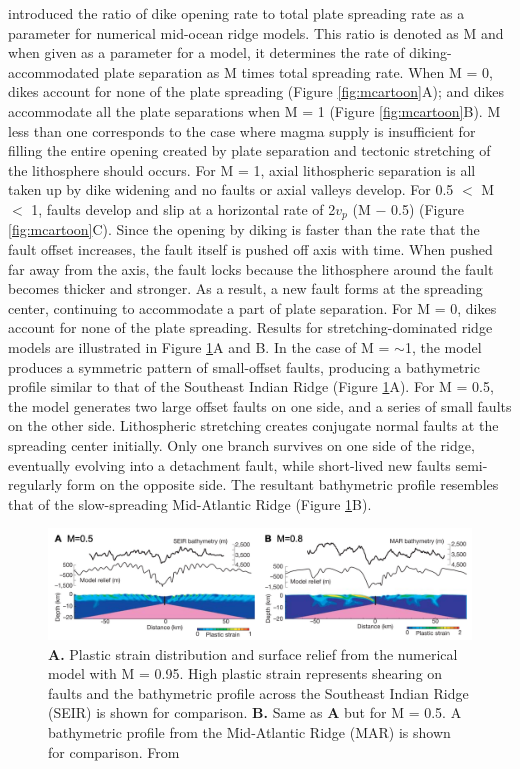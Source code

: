 \documentclass[letterpaper,12pt,notitle]{memphisthesis}                     %
\begin{document}
\citet{Buck2005} introduced the ratio of dike opening rate to total plate spreading rate as a parameter for numerical mid-ocean ridge models. This ratio is denoted as M and when given as a parameter for a model, it determines the rate of diking-accommodated plate separation as M times total spreading rate. When M = 0, dikes account for none of the plate spreading (Figure \ref{fig:mcartoon}A); and dikes accommodate all the plate separations when M = 1 (Figure \ref{fig:mcartoon}B). M less than one corresponds to the case where magma supply is insufficient for filling the entire opening created by plate separation and tectonic stretching of the lithosphere should occurs. For M = 1, axial lithospheric separation is all taken up by dike widening and no faults or axial valleys develop.  For 0.5 $<$ M $<$ 1, faults develop and slip at a horizontal rate of 2$v_p$ (M $-$ 0.5) (Figure \ref{fig:mcartoon}C). Since the opening by diking is faster than the rate that the fault offset increases, the fault itself is pushed off axis with time. When pushed far away from the axis, the fault locks because the lithosphere around the fault becomes thicker and stronger. As a result, a new fault forms at the spreading center, continuing to accommodate a part of plate separation. For M = 0, dikes account for none of the plate spreading. Results for stretching-dominated ridge models are illustrated in Figure \ref{fig:mfactor}A and B. In the case of M = $\sim$1, the model produces a symmetric pattern of small-offset faults, producing a bathymetric profile similar to that of the Southeast Indian Ridge (Figure \ref{fig:mfactor}A). For M = 0.5, the model generates two large offset faults on one side, and a series of small faults on the other side. Lithospheric stretching creates conjugate normal faults at the spreading center initially. Only one branch survives on one side of the ridge, eventually evolving into a detachment fault, while short-lived new faults semi-regularly form on the opposite side. The resultant bathymetric profile resembles that of the slow-spreading Mid-Atlantic Ridge (Figure \ref{fig:mfactor}B).
%
\begin{figure}[!htb]
	\centering
	\includegraphics[width=0.99\linewidth]{./figs/fig1.png}
	\caption{\textbf{A.} Plastic strain distribution and surface relief from the numerical model with M = 0.95. High plastic strain represents shearing on faults and the bathymetric profile across the Southeast Indian Ridge (SEIR) is shown for comparison. \textbf{B.} Same as \textbf{A} but for M = 0.5. A bathymetric profile from the Mid-Atlantic Ridge (MAR) is shown for comparison. From \citet{Buck2005}}
	\label{fig:mfactor}
\end{figure}
\end{document}
